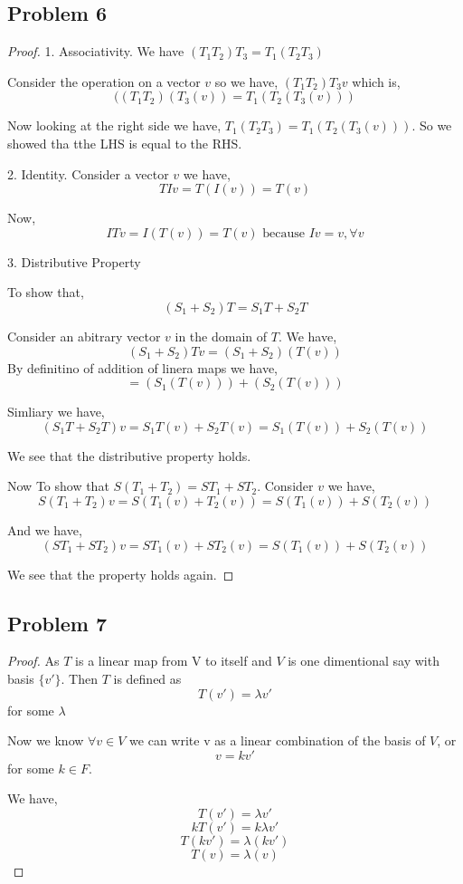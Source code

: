 \documentclass[a4paper]{report}
\begin{document}
\subsection*{Problem 6}
\begin{proof}
     
1. Associativity. We have $(T_1T_2)T_3 = T_1(T_2T_3)$

Consider the operation on a vector $v$ so we have,  $(T_1T_2)T_3v$ which is, 
$$ ((T_1T_2)(T_3(v)) = T_1(T_2(T_3(v)))$$ 

Now looking at the right side we have, $T_1(T_2T_3) = T_1(T_2(T_3(v)))$. So we showed tha tthe LHS is equal to the RHS.

2. Identity. Consider a vector $v$ we have,  
$$ TIv = T(I(v)) = T(v)$$ 

Now, 
$$ ITv = I(T(v))  = T(v) \text{ because $Iv = v, \forall v$}  $$ 

3. Distributive Property

To show that, 
$$ (S_1+S_2)T  = S_1T + S_2T$$ 

Consider an abitrary vector $v$ in the domain of $T$. We have,  
$$ (S_1+S_2)Tv = (S_1+S_2)(T(v)) $$ 
By definitino of addition of linera maps we have, 
$$= (S_1(T(v))) + (S_2(T(v)))$$ 

Simliary we have, 
$$ (S_1T + S_2T)v = S_1T(v) + S_2T(v) = S_1(T(v)) + S_2(T(v))$$ 

We see that the distributive property holds.


Now To show that $S(T_1+T_2) = ST_1 + ST_2$. Consider $v$ we have, 
$$ S(T_1+T_2)v = S(T_1(v) + T_2(v)) = S(T_1(v)) + S(T_2(v)) $$ 

And we have, 
$$ (ST_1 + ST_2)v = ST_1(v) + ST_2(v) = S(T_1(v)) + S(T_2(v))$$ 

We see that the property holds again.



\end{proof}

\subsection*{Problem 7}
\begin{proof}
    As $T$ is a linear map from V to itself and $V$ is one dimentional say with basis $\{v'\}$. Then $T$ is defined as  
    $$ T(v') = \lambda v' $$ for some $\lambda $

    Now we know  $\forall v \in V$ we can write v as a linear combination of the basis of $V$, or 
    $$ v = kv'  $$ for some $k \in F$.

    We have,  
    $$ T(v') = \lambda v' $$ 
    $$ kT(v') = k\lambda v' $$ 
    $$ T(kv') = \lambda (kv') $$ 
    $$ T(v) = \lambda (v) $$ 
\end{proof}
\end{document}
